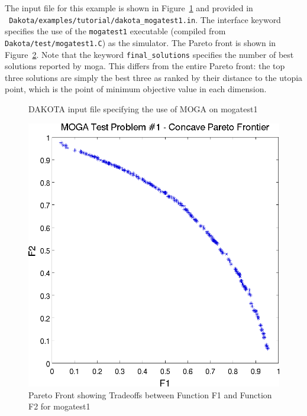 The input file for this example is shown in
Figure~\ref{additional:moga1inp} and provided in \\ {\tt
Dakota/examples/tutorial/dakota\_mogatest1.in}.  The interface keyword
specifies the use of the \texttt{mogatest1} executable (compiled from
\texttt{Dakota/test/mogatest1.C}) as the simulator.  The Pareto front
is shown in Figure~\ref{additional:moga1front}.  Note that the keyword \texttt{final\_solutions} specifies the number 
of best solutions reported by moga.  This differs from the entire Pareto front:  the top three solutions are simply the best 
three as ranked by their distance to the utopia point, 
which is the point of minimum objective value in 
each dimension. 

\begin{figure}
  \centering
  \begin{small}
    \begin{bigbox}
    \end{bigbox}
  \end{small}
  \caption{DAKOTA input file specifying the use of MOGA on mogatest1}
  \label{additional:moga1inp}
\end{figure}

\begin{figure}
  \centering
  \includegraphics[scale=0.75]{images/dakota_mogatest1_pareto_front}
  \caption{Pareto Front showing Tradeoffs between Function F1 and
    Function F2 for mogatest1}
  \label{additional:moga1front}
\end{figure}

